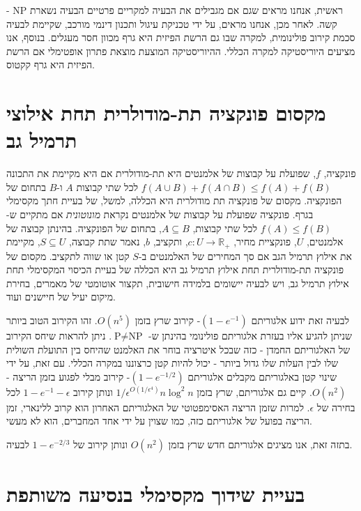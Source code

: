 \begin{hebrew}
ראשית, אנחנו מראים שגם אם מגבילים את הבעיה למקריים פרטיים הבעיה נשארת
$\text{NP}$%
-קשה.
לאחר מכן, אנחנו מראים, על ידי טכניקת עיגול ותכנון דינמי מורכב, שקיימת לבעיה סכמת קירוב פולינומית, למקרה שבו גם הרשת הפיזית היא גרף מכוון חסר מעגלים.
בנוסף, אנו מציעים היוריסטיקה למקרה הכללי.
ההיוריסטיקה המוצעת  מוצאת פתרון אופטימלי אם הרשת הפיזית היא גרף קקטוס.



\section*{\texthebrew{מקסום פונקציה תת-מודולרית תחת אילוצי תרמיל גב}}
פונקציה,
$f$,
שפועלת על קבוצות של אלמנטים היא תת-מודולרית אם היא מקיימת את התכונה
$f(A \cup B) + f(A \cap B) \leq f(A) + f(B)$
לכל שתי קבוצות $A$ ו-$B$ בתחום של הפונקציה.
מקסום של פונקציה תת מודולרית היא הכללה, למשל, של בעיית חתך מקסימלי בגרף.
פונקציה שפועלת על קבוצות  של אלמנטים נקראת
\emph{מונוטונית}
אם מתקיים ש-%
$f(A) \leq f(B)$
לכל שתי קבוצות,
$A \subseteq B$,
בתחום של הפונקציה.
בהינתן קבוצה של אלמנטים, $U$, פונקציית מחיר,
$c:U \to \mathbb{R_+}$,
ותקציב, $b$, נאמר שתת קבוצה,
$S \subseteq U$,
מקיימת את אילוץ תרמיל הגב אם סך המחירים של האלמנטים ב-$S$ קטן או שווה לתקציב.
מקסום של פונקציה תת-מודולרית תחת אילוץ תרמיל גב היא הכללה של בעיית הכיסוי המקסימלי תחת אילוץ תרמיל גב,
ויש לבעיה יישומים בלמידה חישובית, תקצור אוטומטי של מאמרים, בחירת מיקום יעיל של חיישנים ועוד.


לבעיה זאת ידוע אלגוריתם
$(1-e^{-1})$-%
קירוב שרץ בזמן
$O(n^5)$.
זהו הקירוב הטוב ביותר שניתן להגיע אליו בעזרת אלגוריתם פולינומי בהינתן ש-%
$\text{P} \neq \text{NP}$.
ניתן להראות שיחס הקירוב של האלגוריתם החמדן - כזה שבכל איטרציה בוחר את האלמנט שהיחס בין התועלת השולית שלו לבין העלות שלו גדול ביותר - יכול להיות קטן כרצוננו במקרה הכללי.
עם זאת, על ידי שינוי קטן באלגוריתם מקבלים אלגוריתם
$(1 - e^{-1/2})$-%
קירוב מבלי לפגוע בזמן הריצה -
$O(n^2)$.
קיים גם אלגוריתם, שרץ בזמן
$1/\epsilon^{O(1/\epsilon^4)}n\log^2n$
ונותן קירוב
$1 - e^{-1} -\epsilon$
לכל בחירה של
$\epsilon$.
למרות שזמן הריצה האסימפטוטי של האלגוריתם האחרון הוא קרוב ללינארי, זמן הריצה בפועל של אלגוריתם כזה, כמו שצוין על ידי אחד המחברים, הוא לא מעשי.

בתזה זאת, אנו מציגים אלגוריתם חדש שרץ בזמן
$O(n^2)$
ונותן קירוב של
$1 - e^{-2/3}$
לבעיה.




\section*{\texthebrew{בעיית שידוך מקסימלי בנסיעה משותפת}}


\end{hebrew}
